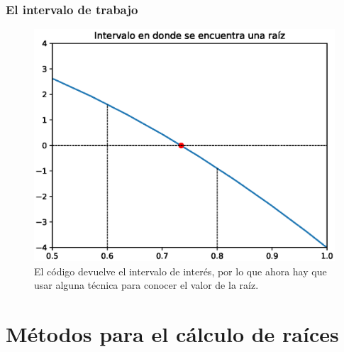 \begin{frame}
\frametitle{El intervalo de trabajo}
\begin{figure}
	\centering
	\includegraphics[scale=0.5]{Imagenes/aprox_sucesivas_2020_03.eps}
	\caption{El código devuelve el intervalo de interés, por lo que ahora hay que usar alguna técnica para conocer el valor de la raíz.} 
\end{figure}
\end{frame}
\section{Métodos para el cálculo de raíces}
